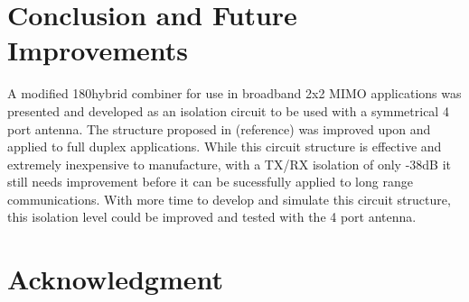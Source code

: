 \section{Conclusion and Future Improvements}
A modified 180\degree\space hybrid combiner for use in broadband 2x2 MIMO applications was presented and developed as an isolation circuit to be used with a symmetrical 4 port antenna. The structure proposed in (reference) was improved upon and applied to full duplex applications. While this circuit structure is effective and extremely inexpensive to manufacture, with a TX/RX isolation of only -38dB it still needs  improvement before it can be sucessfully applied to long range communications. With more time to develop and simulate this circuit structure, this isolation level could be improved and tested with the 4 port antenna.






%





\section*{Acknowledgment}


